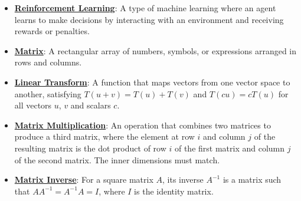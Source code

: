\documentclass{article}%
\begin{document}
\begin{itemize}[leftmargin=*]
\item \href{https://purdue.brightspace.com/d2l/common/assets/pdfjs-d2l-dist/1.0.14-legacy/web/viewer.html?file=%2Fcontent%2Fenforced%2F1095467-wl.202510.CS.24300.001%2F02L2-Intro.pdf%3Fou%3D1095467&lang=en-us&container=d2l-fileviewer-rendered-pdf&fullscreen=d2l-fileviewer-rendered-pdf-dialog&height=667#page=46}{\textbf{Reinforcement Learning}}: A type of machine learning where an agent learns to make decisions by interacting with an environment and receiving rewards or penalties.%
\end{itemize}%
\begin{itemize}[leftmargin=*]%
\item \href{https://purdue.brightspace.com/d2l/common/assets/pdfjs-d2l-dist/1.0.14-legacy/web/viewer.html?file=%2Fcontent%2Fenforced%2F1095467-wl.202510.CS.24300.001%2F04L1-Linear Algebra Primer.pdf%3Fou%3D1095467&lang=en-us&container=d2l-fileviewer-rendered-pdf&fullscreen=d2l-fileviewer-rendered-pdf-dialog&height=667#page=4}{\textbf{Matrix}}: A rectangular array of numbers, symbols, or expressions arranged in rows and columns.%
\item \href{https://purdue.brightspace.com/d2l/common/assets/pdfjs-d2l-dist/1.0.14-legacy/web/viewer.html?file=%2Fcontent%2Fenforced%2F1095467-wl.202510.CS.24300.001%2F04L1-Linear Algebra Primer.pdf%3Fou%3D1095467&lang=en-us&container=d2l-fileviewer-rendered-pdf&fullscreen=d2l-fileviewer-rendered-pdf-dialog&height=667#page=5}{\textbf{Linear Transform}}: A function that maps vectors from one vector space to another, satisfying $T(u + v) = T(u) + T(v)$ and $T(cu) = cT(u)$ for all vectors $u$, $v$ and scalars $c$.%
\item \href{https://purdue.brightspace.com/d2l/common/assets/pdfjs-d2l-dist/1.0.14-legacy/web/viewer.html?file=%2Fcontent%2Fenforced%2F1095467-wl.202510.CS.24300.001%2F04L1-Linear Algebra Primer.pdf%3Fou%3D1095467&lang=en-us&container=d2l-fileviewer-rendered-pdf&fullscreen=d2l-fileviewer-rendered-pdf-dialog&height=667#page=14}{\textbf{Matrix Multiplication}}: An operation that combines two matrices to produce a third matrix, where the element at row $i$ and column $j$ of the resulting matrix is the dot product of row $i$ of the first matrix and column $j$ of the second matrix. The inner dimensions must match.%
\item \href{https://purdue.brightspace.com/d2l/common/assets/pdfjs-d2l-dist/1.0.14-legacy/web/viewer.html?file=%2Fcontent%2Fenforced%2F1095467-wl.202510.CS.24300.001%2F04L1-Linear Algebra Primer.pdf%3Fou%3D1095467&lang=en-us&container=d2l-fileviewer-rendered-pdf&fullscreen=d2l-fileviewer-rendered-pdf-dialog&height=667#page=10}{\textbf{Matrix Inverse}}: For a square matrix $A$, its inverse $A^{-1}$ is a matrix such that $AA^{-1} = A^{-1}A = I$, where $I$ is the identity matrix.%

\end{itemize}
\end{document}
